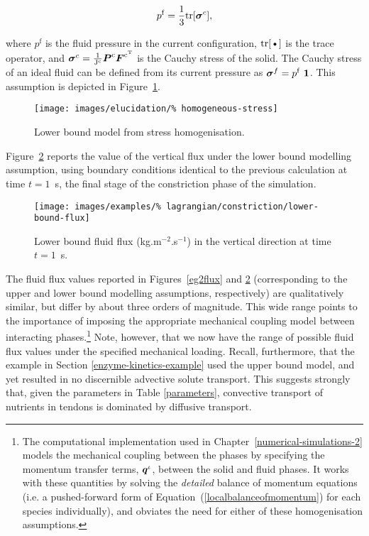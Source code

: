 \begin{equation}
p^{\mathrm{f}} = \frac{1}{3} \mathrm{tr}[\mbox{\boldmath$\sigma$}^{c}],
\label{equalpr}
\end{equation}

\noindent where $p^{\mathrm{f}}$ is the fluid pressure in the current
configuration, $\mbox{tr[\textbullet]}$ is the trace operator,
and $\mbox{\boldmath$\sigma$}^{c}=\frac{1}{\mathrm{J^{c}}} \mbox{\boldmath$ P$}^{\mathrm{c}}
\mbox{\boldmath$ F$}^{\mathrm{c}^{\mathrm{T}}}$ is the Cauchy stress of the solid. The
Cauchy stress of an ideal fluid can be defined from its current
pressure as \mbox{$\Bsigma^{f}= p^{\mathrm{f}}\ \bone$.} This
assumption is depicted in Figure~\ref{lower-bound-model}.

\begin{figure}[ht]
  \centering
  \texttt{[image: images/elucidation/\%
    homogeneous-stress]}
  \caption{Lower bound model from stress homogenisation.}
  \label{lower-bound-model}
\end{figure}

Figure~{\ref{lowerbound}} reports the value of the vertical flux under
the lower bound modelling assumption, using boundary conditions
identical to the previous calculation at time $t=1$~s, the final stage
of the constriction phase of the simulation.

\begin{figure}[!hpt]
  \centering
  \texttt{[image: images/examples/\%
    lagrangian/constriction/lower-bound-flux]}
  \caption{Lower bound fluid flux (kg.m$^{-2}$.s$^{-1}$) in the
    vertical direction at time $t=1$~s.}
  \label{lowerbound}
\end{figure}

The fluid flux values reported in Figures~\ref{eg2flux} and
\ref{lowerbound} (corresponding to the upper and lower bound modelling
assumptions, respectively) are qualitatively similar, but differ by
about three orders of magnitude. This wide range points to the
importance of imposing the appropriate mechanical coupling model
between interacting phases.\footnote{The computational implementation
  used in Chapter~\ref{numerical-simulations-2} models the mechanical
  coupling between the phases by specifying the momentum transfer
  terms, $\mbox{\boldmath$ q$}^{\iota}$, between the solid and fluid phases. It works
  with these quantities by solving the {\em detailed} balance of
  momentum equations (i.e. a pushed-forward form of
  Equation~(\ref{localbalanceofmomentum}) for each species
  individually), and obviates the need for either of these
  homogenisation assumptions.}  Note, however, that we now have the
range of possible fluid flux values under the specified mechanical
loading. Recall, furthermore, that the example in Section
\ref{enzyme-kinetics-example} used the upper bound model, and yet
resulted in no discernible advective solute transport. This suggests
strongly that, given the parameters in Table \ref{parameters},
convective transport of nutrients in tendons is dominated by diffusive
transport.

